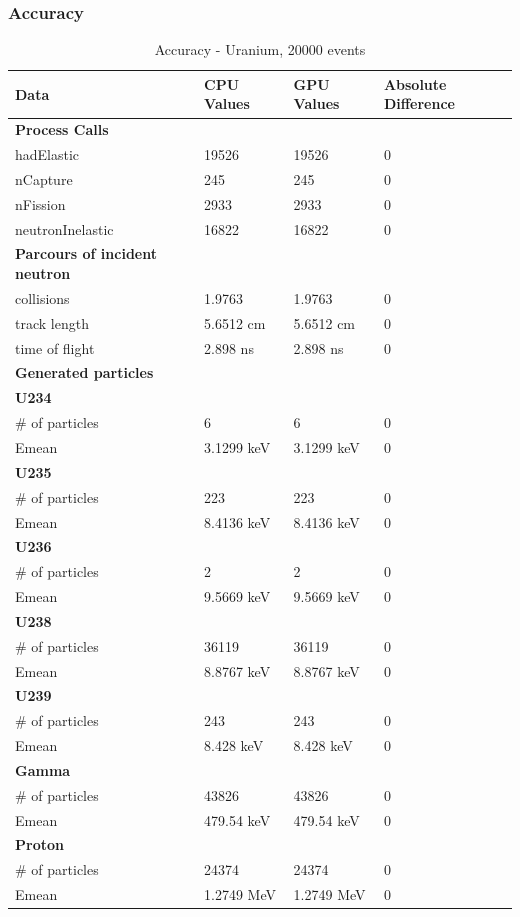 \documentclass[12pt]{article}
\begin{document}
	\subsubsection{Accuracy}
		\begin{table}[H]
		\centering
		\caption{Accuracy - Uranium, 20000 events}\label{sys5Acc}
		\begin{tabular}{llll}
		\toprule
		\bf Data & CPU Values & GPU Values & Absolute Difference\\\midrule
		\bf Process Calls&&&\\
		hadElastic&19526&19526&0\\
		nCapture&245&245&0\\
		nFission&2933&2933&0\\
		neutronInelastic&16822&16822&0\\ 
		
		\midrule
		\bf Parcours of incident neutron&&&\\
		collisions&1.9763&1.9763&0\\
		track length&5.6512 cm&5.6512 cm&0\\
		time of flight&2.898 ns&2.898 ns&0\\

		\midrule
		\bf Generated particles&&&\\
		\bf{U234}&&&\\
		\# of particles&6&6&0\\
		Emean&3.1299 keV&3.1299 keV&0\\
		
		\bf{U235}&&&\\
		\# of particles&223&223&0\\
		Emean&8.4136 keV&8.4136 keV&0\\
		
		\bf{U236}&&&\\
		\# of particles&2&2&0\\
		Emean&9.5669 keV&9.5669 keV&0\\
		
		\bf{U238}&&&\\
		\# of particles&36119&36119&0\\
		Emean&8.8767 keV&8.8767 keV&0\\
		
		\bf{U239}&&&\\
		\# of particles&243&243&0\\
		Emean&8.428 keV&8.428 keV&0\\
		\bf{Gamma}&&&\\
		\# of particles&43826&43826&0\\
		Emean&479.54 keV&479.54 keV&0\\
		\bf{Proton}&&&\\
		\# of particles&24374&24374&0\\
		Emean&1.2749 MeV&1.2749 MeV&0\\\bottomrule
		\end{tabular}
		\end{table}
\end{document}
